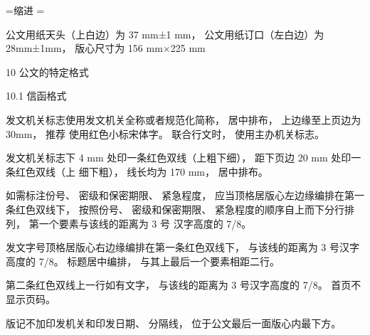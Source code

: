 \documentclass{article}
\begin{document}
\fontsize{15.85}{15.85}
=\hbox{缩进}
\parindent=
\baselineskip=10.446428571428571mm

\hoffset=-56pt
\voffset=1pt


公文用纸天头（上白边）为 37 mm±1 mm，
公文用纸订口（左白边）为 28mm±1mm，
版心尺寸为 156 mm×225 mm


10 公文的特定格式

10.1 信函格式

发文机关标志使用发文机关全称或者规范化简称， 居中排布， 上边缘至上页边为 30mm， 推荐
使用红色小标宋体字。 联合行文时， 使用主办机关标志。

发文机关标志下 4 mm 处印一条红色双线（上粗下细）， 距下页边 20 mm 处印一条红色双线（上
细下粗）， 线长均为 170 mm， 居中排布。

如需标注份号、 密级和保密期限、 紧急程度， 应当顶格居版心左边缘编排在第一条红色双线下，
按照份号、 密级和保密期限、 紧急程度的顺序自上而下分行排列， 第一个要素与该线的距离为 3 号
汉字高度的 7/8。

发文字号顶格居版心右边缘编排在第一条红色双线下， 与该线的距离为 3 号汉字高度的 7/8。
标题居中编排， 与其上最后一个要素相距二行。

第二条红色双线上一行如有文字， 与该线的距离为 3 号汉字高度的 7/8。
首页不显示页码。

版记不加印发机关和印发日期、 分隔线， 位于公文最后一面版心内最下方。

\the\textwidth

\the\vsize
\the\hsize



\pagestyle{fancy}





\fancyhead[L,R]{}
\fancyfoot[L]{}
\fancyfoot[C]{}
\fancyfoot[R]{\thepage}
\renewcommand{\headrulewidth}{0.4pt}
\renewcommand{\footrulewidth}{2pt}



\setlength\headwidth{170mm}

\newdimen\doublelineskip %
\setlength\doublelineskip{2pt}
\renewcommand\headrule{%

  {\color{red}%
  \vskip 4mm%
  \hrule height\headrulewidth width\headwidth%
  \vskip \doublelineskip%
  \hrule height 1pt width\headwidth}%
  }
  
\renewcommand\footrule{{%
  \color{red}%
  \vskip 4mm%
  \hrule height 1pt width \headwidth%
  \vskip \doublelineskip%
  \hrule height \headrulewidth width\headwidth%
  }}
\end{document}
